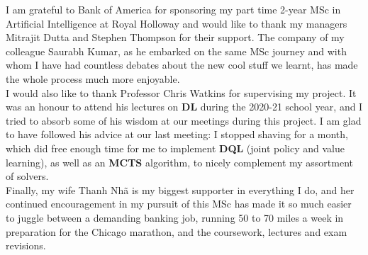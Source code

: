 I am grateful to Bank of America for sponsoring my part time 2-year MSc in Artificial Intelligence at Royal Holloway and would like to thank my managers Mitrajit Dutta and Stephen Thompson for their support. The company of my colleague Saurabh Kumar, as he embarked on the same MSc journey and with whom I have had countless debates about the new cool stuff we learnt, has made the whole process much more enjoyable.
\\
I would also like to thank Professor Chris Watkins for supervising my project. It was an honour to attend his lectures on \textbf{DL} during the 2020-21 school year, and I tried to absorb some of his wisdom at our meetings during this project. I am glad to have followed his advice at our last meeting: I stopped shaving for a month, which did free enough time for me to implement \textbf{DQL} (joint policy and value learning), as well as an \textbf{MCTS} algorithm, to nicely complement my assortment of solvers.
\\
Finally, my wife Thanh Nh\~a is my biggest supporter in everything I do, and her continued encouragement in my pursuit of this MSc has made it so much easier to juggle between a demanding banking job, running 50 to 70 miles a week in preparation for the Chicago marathon, and the coursework, lectures and exam revisions.